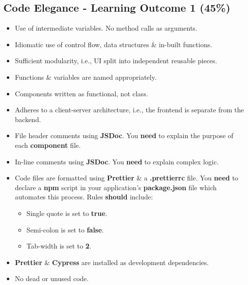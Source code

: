 \documentclass{article}
\begin{document}
\subsection*{Code Elegance - Learning Outcome 1 (45\%)}
\begin{itemize}
  \item Use of intermediate variables. No method calls as arguments.
  \item Idiomatic use of control flow, data structures \& in-built functions.
  \item Sufficient modularity, i.e., UI split into independent reusable pieces.
  \item Functions \& variables are named appropriately.
  \item Components written as functional, not class.
  \item Adheres to a client-server architecture, i.e., the frontend is separate from the backend.
  \item File header comments using \textbf{JSDoc}. You \textbf{need} to explain the purpose of each \textbf{component} file.
  \item In-line comments using \textbf{JSDoc}. You \textbf{need} to explain complex logic.
  \item Code files are formatted using \textbf{Prettier} \& a \textbf{.prettierrc} file. You \textbf{need} to declare a \textbf{npm} script in your application's \textbf{package.json} file which automates this process. Rules \textbf{should} include:
        \begin{itemize}
          \item Single quote is set to \textbf{true}.
          \item Semi-colon is set to \textbf{false}.
          \item Tab-width is set to \textbf{2}.
        \end{itemize}
  \item \textbf{Prettier} \& \textbf{Cypress} are installed as development dependencies.
  \item No dead or unused code.
\end{itemize}
\end{document}
